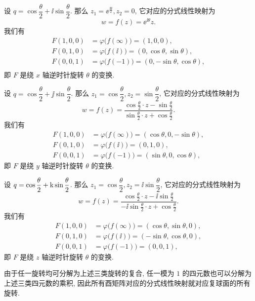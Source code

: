 \begin{exampleenum}
  \item 设 $q=\cos\dfrac\theta2+\ii\sin\dfrac\theta 2$.
  那么 $z_1=\ee^{\frac{\ii\theta}2}, z_2=0$, 它对应的分式线性映射为
  \[
    w=f(z)=\ee^{\ii\theta}z.
  \]
  我们有
  \begin{align*}
      F(1,0,0)&
    =\varphi\bigl(f(\infty)\bigr)
    =(1,0,0),\\
      F(0,1,0)&
    =\varphi\bigl(f(\ii)\bigr)
    =(0,\cos\theta,\sin\theta),\\
      F(0,0,1)&
    =\varphi\bigl(f(-1)\bigr)
    =(0,-\sin\theta,\cos\theta),\\
  \end{align*}
  即 $F$ 是绕 $x$ 轴逆时针旋转 $\theta$ 的变换.
  \item 设 $q=\cos\dfrac\theta2+\jj\sin\dfrac\theta 2$.
  那么 $z_1=\cos\dfrac\theta2, z_2=\sin\dfrac\theta2$, 它对应的分式线性映射为
  \[
    w=f(z)=\frac{\cos \frac\theta2 \cdot z-\sin\frac\theta2}{\sin\frac\theta2 \cdot z+\cos\frac\theta2}.
  \]
  我们有
  \begin{align*}
      F(1,0,0)&
    =\varphi\bigl(f(\infty)\bigr)
    =(\cos\theta,0,-\sin\theta),\\
      F(0,1,0)&
    =\varphi\bigl(f(\ii)\bigr)
    =(0,1,0),\\
      F(0,0,1)&
    =\varphi\bigl(f(-1)\bigr)
    =(\sin\theta,0,\cos\theta),
  \end{align*}
  即 $F$ 是绕 $y$ 轴逆时针旋转 $\theta$ 的变换.
  \item 设 $q=\cos\dfrac\theta2+\mathrm{k}\sin\dfrac\theta 2$.
  那么 $z_1=\cos\dfrac\theta2, z_2=\ii\sin\dfrac\theta2$, 它对应的分式线性映射为
  \[
    w=f(z)=\frac{\cos \frac\theta2 \cdot z-\ii \sin\frac\theta2}{-\ii\sin\frac\theta2 \cdot z+\cos\frac\theta2}.
  \]
  我们有
  \begin{align*}
      F(1,0,0)&
    =\varphi\bigl(f(\infty)\bigr)
    =(\cos\theta,\sin\theta,0),\\
      F(0,1,0)&
    =\varphi\bigl(f(\ii)\bigr)
    =(-\sin\theta,\cos\theta,0),\\
      F(0,0,1)&
    =\varphi\bigl(f(-1)\bigr)
    =(0,0,1),
  \end{align*}
  即 $F$ 是绕 $z$ 轴逆时针旋转 $\theta$ 的变换.
  
  由于任一旋转均可分解为上述三类旋转的复合, 任一模为 $1$ 的四元数也可以分解为上述三类四元数的乘积, 因此所有酉矩阵对应的分式线性映射就对应复球面的所有旋转.
\end{exampleenum}

